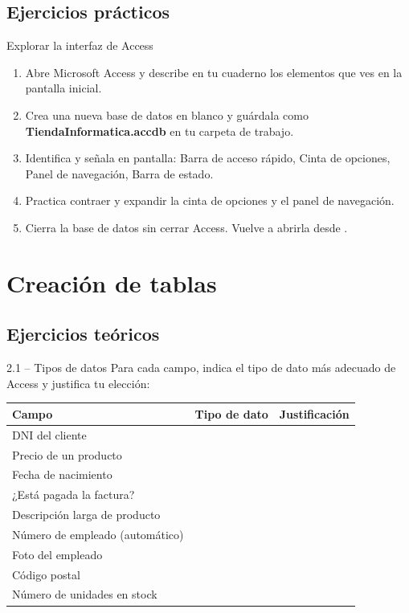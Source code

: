 \documentclass[12pt,a4paper]{article}
\begin{document}
\subsection{Ejercicios prácticos}

\begin{practica}{Explorar la interfaz de Access}
\begin{enumerate}
  \item Abre Microsoft Access y describe en tu cuaderno los elementos que ves en la pantalla inicial.
  \item Crea una nueva base de datos en blanco y guárdala como \textbf{TiendaInformatica.accdb} en tu carpeta de trabajo.
  \item Identifica y señala en pantalla: Barra de acceso rápido, Cinta de opciones, Panel de navegación, Barra de estado.
  \item Practica contraer y expandir la cinta de opciones y el panel de navegación.
  \item Cierra la base de datos sin cerrar Access. Vuelve a abrirla desde .
\end{enumerate}
\end{practica}

\section{Creación de tablas}

\subsection{Ejercicios teóricos}

\begin{ejercicio}{2.1 -- Tipos de datos}
Para cada campo, indica el tipo de dato más adecuado de Access y justifica tu elección:

\begin{center}
\renewcommand{\arraystretch}{1.4}
\begin{tabular}{p{5cm} | p{4cm} | p{4cm}}
\textbf{Campo} & \textbf{Tipo de dato} & \textbf{Justificación} \\
\hline
DNI del cliente & & \\
Precio de un producto & & \\
Fecha de nacimiento & & \\
¿Está pagada la factura? & & \\
Descripción larga de producto & & \\
Número de empleado (automático) & & \\
Foto del empleado & & \\
Código postal & & \\
Número de unidades en stock & & \\
\end{tabular}
\end{center}
\end{ejercicio}
\end{document}
